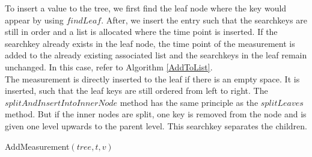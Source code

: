 \documentclass[abstracton,12pt]{scrreprt}
\begin{document}
To insert a value to the tree, we first find the leaf node where the key would appear by using $findLeaf$. After, we insert the entry such that the searchkeys are still in order and a list is allocated where the time point is inserted. If the searchkey already exists in the leaf node, the time point of the measurement is added to the already existing associated list and the searchkeys in the leaf remain unchanged. In this case, refer to Algorithm \ref{AddToList}. \\
The measurement is directly inserted to the leaf if there is an empty space. It is inserted, such that the leaf keys are still ordered from left to right. The $splitAndInsertIntoInnerNode$ method has the same principle as the $splitLeaves$ method. But if the inner nodes are split, one key is removed from the node and is given one level upwards to the parent level. This searchkey separates the children. 
\BlankLine
\begin{algorithm}[H]
	\IncMargin{1em}
	\SetAlgoLined
	\DontPrintSemicolon
	
	
	

	\caption{AddMeasurement$(tree, t, v)$}	\label{AddMeasurement}
\end{algorithm}

\end{document}
